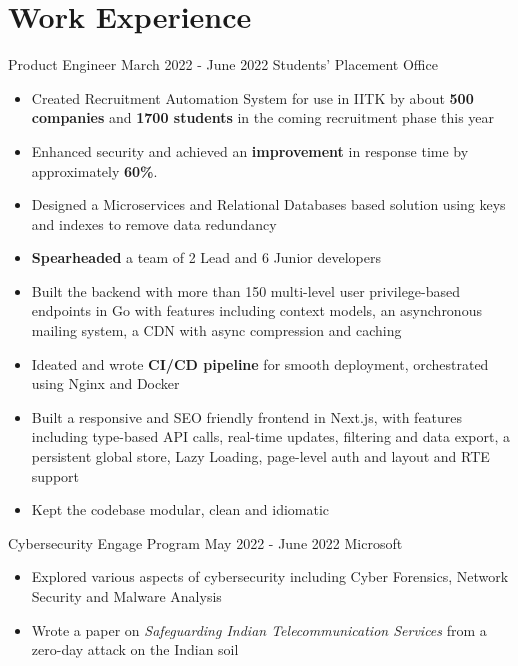 \section*{\sc Work Experience}
\vspace{-2mm}
\hrulefill
\vspace{1mm}

\excventry
{Product Engineer}
{March 2022 - June 2022}
{Students' Placement Office}
{
  \begin{itemize}
    \item Created Recruitment Automation System for use in IITK by about \textbf{500 companies} and \textbf{1700 students} in the coming recruitment phase this year  
    \item Enhanced security and achieved an \textbf{improvement} in response time by approximately \textbf{60\%}.
    \item Designed a Microservices and Relational Databases based solution using keys and indexes to remove data redundancy 
    \item \textbf{Spearheaded} a team of 2 Lead and 6 Junior developers
    \item Built the backend with more than 150 multi-level user privilege-based endpoints in Go with features including context models, an asynchronous mailing system, a CDN with async compression and caching 
    \item Ideated and wrote \textbf{CI/CD pipeline} for smooth deployment, orchestrated using Nginx and Docker
    \item Built a responsive and SEO friendly frontend in Next.js, with features including type-based API calls, real-time updates, filtering and data export, a persistent global store, Lazy Loading, page-level auth and layout and RTE support
    \item Kept the codebase modular, clean and idiomatic
  \end{itemize}
}


\excventry
{Cybersecurity Engage Program}
{May 2022 - June 2022}
{Microsoft}
{
  \begin{itemize}
    \item Explored various aspects of cybersecurity including Cyber Forensics, Network Security and Malware Analysis
    \item Wrote a paper on \textit{Safeguarding Indian Telecommunication Services} from a zero-day attack on the Indian soil
  \end{itemize}
}

